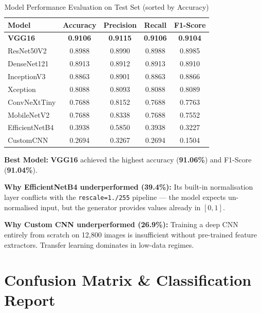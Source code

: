 \documentclass[12pt,a4paper]{article}
\newcommand{\code}[1]{\texttt{\small #1}}
\newcommand{\modelname}[1]{\textbf{#1}}
\begin{document}
\begin{table}[H]
\centering
\caption{Model Performance Evaluation on Test Set (sorted by Accuracy)}
\label{tab:perf_metrics}
\begin{tabular}{l c c c c}
  \toprule
  \textbf{Model} & \textbf{Accuracy} & \textbf{Precision} & \textbf{Recall} & \textbf{F1-Score} \\
  \midrule
  \rowcolor{green!12} \textbf{VGG16}       & \textbf{0.9106} & \textbf{0.9115} & \textbf{0.9106} & \textbf{0.9104} \\
  ResNet50V2     & 0.8988 & 0.8990 & 0.8988 & 0.8985 \\
  DenseNet121    & 0.8913 & 0.8912 & 0.8913 & 0.8910 \\
  InceptionV3    & 0.8863 & 0.8901 & 0.8863 & 0.8866 \\
  Xception       & 0.8088 & 0.8093 & 0.8088 & 0.8089 \\
  ConvNeXtTiny   & 0.7688 & 0.8152 & 0.7688 & 0.7763 \\
  MobileNetV2    & 0.7688 & 0.8338 & 0.7688 & 0.7552 \\
  EfficientNetB4 & 0.3938 & 0.5850 & 0.3938 & 0.3227 \\
  CustomCNN      & 0.2694 & 0.3267 & 0.2694 & 0.1504 \\
  \bottomrule
\end{tabular}
\end{table}

\begin{insightbox}
\textbf{Best Model:} \modelname{VGG16} achieved the highest accuracy (\textbf{91.06\%}) and F1-Score (\textbf{91.04\%}).

\smallskip
\textbf{Why EfficientNetB4 underperformed (39.4\%):} Its built-in normalisation layer conflicts with the \code{rescale=1./255} pipeline --- the model expects un-normalised input, but the generator provides values already in $[0,1]$.

\smallskip
\textbf{Why Custom CNN underperformed (26.9\%):} Training a deep CNN entirely from scratch on 12,800 images is insufficient without pre-trained feature extractors. Transfer learning dominates in low-data regimes.
\end{insightbox}

\section{Confusion Matrix \& Classification Report}
\end{document}
